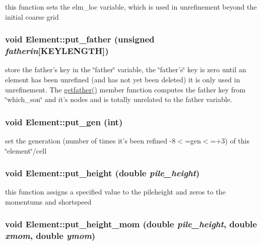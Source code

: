 this function sets the elm\_\-loc variable, which is used in unrefinement beyond the initial coarse grid 

\hypertarget{classElement_a23}{
\subsubsection[put\_\-father]{\setlength{\rightskip}{0pt plus 5cm}void Element::put\_\-father (unsigned {\em fatherin}\mbox{[}KEYLENGTH\mbox{]})}}
\label{classElement_a23}


store the father's key in the \char`\"{}father\char`\"{} variable, the \char`\"{}father's\char`\"{} key is zero until an element has been unrefined (and has not yet been deleted) it is only used in unrefinement. The \hyperlink{classElement_a22}{getfather()} member function computes the father key from \char`\"{}which\_\-son\char`\"{} and it's nodes and is totally unrelated to the father variable. 

\hypertarget{classElement_a13}{
\subsubsection[put\_\-gen]{\setlength{\rightskip}{0pt plus 5cm}void Element::put\_\-gen (int)}}
\label{classElement_a13}


set the generation (number of times it's been refined -8$<$=gen$<$=+3) of this \char`\"{}element\char`\"{}/cell 

\hypertarget{classElement_a64}{
\subsubsection[put\_\-height]{\setlength{\rightskip}{0pt plus 5cm}void Element::put\_\-height (double {\em pile\_\-height})}}
\label{classElement_a64}


this function assigns a specified value to the pileheight and zeros to the momentums and shortspeed 

\hypertarget{classElement_a63}{
\subsubsection[put\_\-height\_\-mom]{\setlength{\rightskip}{0pt plus 5cm}void Element::put\_\-height\_\-mom (double {\em pile\_\-height}, double {\em xmom}, double {\em ymom})}}
\label{classElement_a63}


